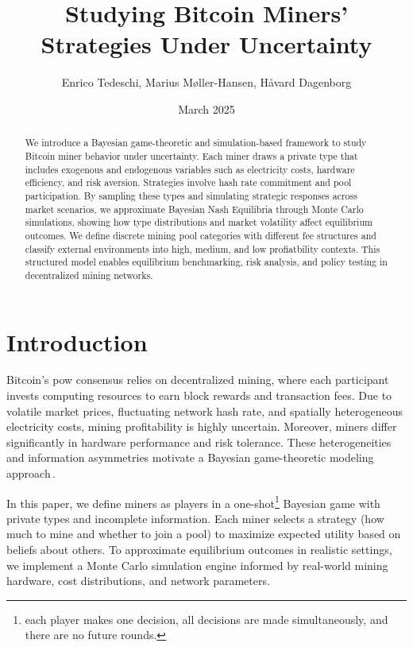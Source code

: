 \documentclass[12pt]{article}
\title{Studying Bitcoin Miners' Strategies Under Uncertainty}
\author{Enrico Tedeschi, Marius M{\o}ller-Hansen, H{\aa}vard Dagenborg}
\affil{UiT - The Arctic University of Norway}
\date{March 2025}
\begin{document}
\maketitle

\begin{abstract}
	We introduce a Bayesian game-theoretic and simulation-based framework to study Bitcoin miner behavior under uncertainty. Each miner draws a private type that includes exogenous and endogenous variables such as electricity costs, hardware efficiency, and risk aversion. Strategies involve hash rate commitment and pool participation. By sampling these types and simulating strategic responses across market scenarios, we approximate Bayesian Nash Equilibria through Monte Carlo simulations, showing how type distributions and market volatility affect equilibrium outcomes. We define discrete mining pool categories with different fee structures and classify external environments into high, medium, and low profiatbility contexts. This structured model enables equilibrium benchmarking, risk analysis, and policy testing in decentralized mining networks.
\end{abstract}

\section{Introduction}
Bitcoin’s \gls{pow} consensus relies on decentralized mining, where each participant invests computing resources to earn block rewards and transaction fees. Due to volatile market prices, fluctuating network hash rate, and spatially heterogeneous electricity costs, mining profitability is highly uncertain. Moreover, miners differ significantly in hardware performance and risk tolerance. These heterogeneities and information asymmetries motivate a Bayesian game-theoretic modeling approach\,\cite{kiayias2016blockchain,meirowitzpolitical}.

In this paper, we define miners as players in a one-shot\footnote{each player makes one decision, all decisions are made simultaneously, and there are no future rounds.} Bayesian game with private types and incomplete information. Each miner selects a strategy (how much to mine and whether to join a pool) to maximize expected utility based on beliefs about others. To approximate equilibrium outcomes in realistic settings, we implement a Monte Carlo simulation engine informed by real-world mining hardware, cost distributions, and network parameters.
\end{document}

